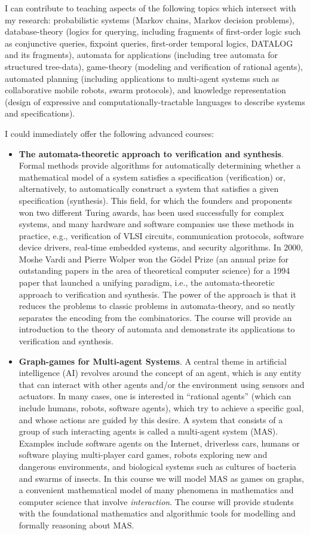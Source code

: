 \documentclass[a4paper,10pt]{scrartcl}
\begin{document}
I can contribute to teaching aspects of the following topics which intersect with my research: probabilistic systems (Markov chains, Markov decision problems), database-theory (logics for querying, including fragments of first-order logic such as conjunctive queries, fixpoint queries, first-order temporal logics, DATALOG and its fragments), automata for applications (including tree automata for structured tree-data), game-theory (modeling and verification of rational agents), automated planning (including applications to multi-agent systems such as collaborative mobile robots, swarm protocols), and knowledge representation (design of expressive and computationally-tractable languages to describe systems and specifications).

I could immediately offer the following advanced courses: 
\begin{itemize}
\item \textbf{The automata-theoretic approach to verification and synthesis}.  Formal methods provide algorithms 
for automatically determining whether a mathematical model of a system satisfies a specification (verification)
or, alternatively, to automatically construct a system that satisfies a given specification (synthesis). 
This field, for which the founders and proponents won two different Turing awards, has been used successfully for
complex systems, and many hardware and software companies use these methods in practice, 
e.g., verification of VLSI circuits, communication protocols, software device drivers, real-time embedded systems, and security algorithms.
In 2000, Moshe Vardi and Pierre Wolper won the G\"odel Prize (an annual prize for outstanding papers in the area of theoretical computer science) for 
a 1994 paper that launched a unifying paradigm, i.e., the automata-theoretic approach to verification and synthesis. 
The power of the approach is that it reduces the problems to classic problems in automata-theory, and so neatly separates the encoding from the combinatorics. 
The course will provide an introduction to the theory of automata and demonstrate its applications to verification and synthesis. 

\item \textbf{Graph-games for Multi-agent Systems}. A central theme in artificial intelligence (AI) revolves around the concept of an agent,
which is any entity that can interact with other agents and/or the environment using sensors 
and actuators. In many cases, one is interested in ``rational agents'' (which can
include humans, robots, software agents), which try to achieve a specific goal, and whose
actions are guided by this desire. A system that consists of a group of such interacting
agents is called a multi-agent system (MAS). Examples include software agents on
the Internet, driverless cars, humans or software playing multi-player card games, robots
exploring new and dangerous environments, and biological systems such as cultures of
bacteria and swarms of insects. In this course we will model MAS as games on graphs, 
a convenient mathematical model of many phenomena in mathematics and computer science that involve \emph{interaction}.
The course will provide students with the foundational mathematics and algorithmic tools for modelling and formally 
reasoning about MAS. 
\end{itemize}
\end{document}
